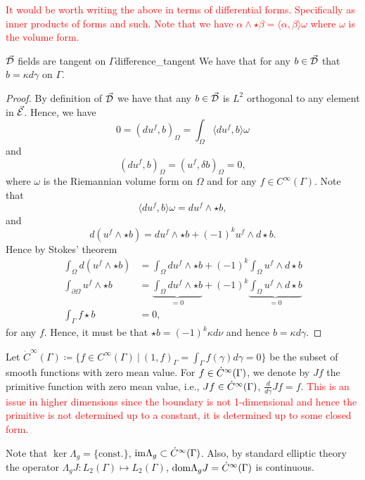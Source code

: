   \textcolor{red}{It would be worth writing the above in terms of differential forms. Specifically as inner products of forms and such. Note that we have $\alpha \wedge \star \beta = \langle \alpha, \beta \rangle \omega$ where $\omega$ is the volume form.}  
  
  \begin{prop}{$\vec{\mathcal{D}}$ fields are tangent on $\Gamma$}{difference_tangent}  
  We have that for any $b\in \vec{\mathcal{D}}$ that $b=\kappa d \gamma$ on $\Gamma$.
  \tcblower
  \begin{proof}	
  By definition of $\vec{\mathcal{D}}$ we have that any $b\in \vec{\mathcal{D}}$ is $L^2$ orthogonal to any element in $\vec{\mathcal{E}}$. Hence, we have
   \[
  0=(du^f,b)_\Omega=\int_\Omega \langle du^f,b\rangle \omega
   \]
   and
   \[
   (du^f,b)_\Omega = (u^f,\delta b)_\Omega =0,
   \]
  where $\omega$ is the Riemannian volume form on $\Omega$ and for any $f\in C^\infty (\Gamma)$.   Note that
  \[
  \langle du^f,b\rangle \omega = du^f \wedge \star b,
  \]
  and
  \[
  d(u^f \wedge \star b) = du^f \wedge \star b + (-1)^k u^f \wedge d\star b.
  \]
  Hence by Stokes' theorem
  \begin{align*}
  	\int_\Omega d(u^f \wedge \star b) &= \int_\Omega du^f \wedge \star b + (-1)^k \int_\Omega u^f \wedge d \star b\\
  	\int_{\partial \Omega} u^f \wedge \star b &=\underbrace{\int_\Omega du^f \wedge \star b}_{=0} + (-1)^k \underbrace{\int_\Omega u^f \wedge d \star b}_{=0}\\
  	\int_\Gamma f \star b &= 0,
  \end{align*}
  for any $f$. Hence, it must be that $\star b = (-1)^k\kappa d\nu$ and hence $b=\kappa d\gamma$.
  \end{proof}
  \end{prop}

Let $\dot{C}^\infty(\Gamma)\coloneqq \{f\in C^\infty (\Gamma) ~\vert~ (1,f)_\Gamma=\int_\Gamma f(\gamma)d\gamma=0\}$ be the subset of smooth functions with zero mean value. For $f\in\dot{C}^\infty(\Gamma)$, we denote by $Jf$ the primitive function with zero mean value, i.e., $Jf\in \dot{C}^\infty(\Gamma)$, $\frac{d}{d\gamma}Jf=f$. \textcolor{red}{This is an issue in higher dimensions since the boundary is not 1-dimensional and hence the primitive is not determined up to a constant, it is determined up to some closed form.}

Note that $\ker \Lambda_g = \{\textrm{const.}\}$, $\mathrm{im} \Lambda_g \subset \dot{C}^\infty(\Gamma)$. Also, by standard elliptic theory the operator $\Lambda_g J \colon L_2(\Gamma) \mapsto L_2(\Gamma)$, $\mathrm{dom} \Lambda_g J = \dot{C}^\infty(\Gamma)$ is continuous.

